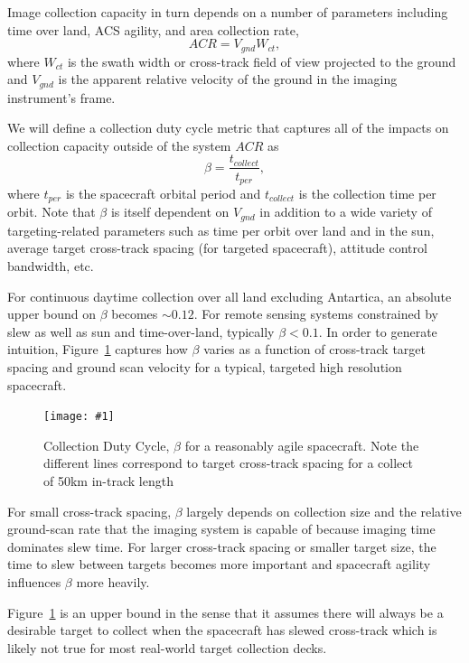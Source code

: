 \documentclass[]{spieman}  %
\newcommand{\includefigure}[3]
{
  \begin{figure}[h!tb]
  \centering
  \texttt{[image: \#1]}
  \caption[]{#3}
  \label{#2}
  \end{figure}
}
\begin{document}
Image collection capacity in turn depends on a number of parameters including time over land, ACS agility, and area collection rate,
\begin{equation}
	\label{eq:acr_def}
    ACR = V_{gnd}W_{ct},
\end{equation}
where $W_{ct}$ is the swath width or cross-track field of view projected to the ground and $V_{gnd}$ is the apparent relative velocity of the ground in the imaging instrument's frame.

We will define a collection duty cycle metric that captures all of the impacts on collection capacity outside of the system $ACR$ as
\begin{equation}
    \beta = \frac{t_{collect}}{t_{per}},
\end{equation} 
where $t_{per}$ is the spacecraft orbital period and $t_{collect}$ is the collection time per orbit.  Note that $\beta$ is itself dependent on $V_{gnd}$ in addition to a wide variety of targeting-related parameters such as time per orbit over land and in the sun, average target cross-track spacing (for targeted spacecraft), attitude control bandwidth, etc.

For continuous daytime collection over all land excluding Antartica, an absolute upper bound on $\beta$ becomes $\sim 0.12$.  For remote sensing systems constrained by slew as well as sun and time-over-land, typically $\beta < 0.1$.  In order to generate intuition, Figure~\ref{fig:beta} captures how $\beta$ varies as a function of cross-track target spacing and ground scan velocity for a typical, targeted high resolution spacecraft.

\includefigure{figures/collection_dc.pgf}{fig:beta}{Collection Duty Cycle, $\beta$ for a reasonably agile spacecraft.  Note the different lines correspond to target cross-track spacing for a collect of 50km in-track length}

For small cross-track spacing, $\beta$ largely depends on collection size and the relative ground-scan rate that the imaging system is capable of because imaging time dominates slew time.  For larger cross-track spacing or smaller target size, the time to slew between targets becomes more important and spacecraft agility influences $\beta$ more heavily.

Figure~\ref{fig:beta} is an upper bound in the sense that it assumes there will always be a desirable target to collect when the spacecraft has slewed cross-track which is likely not true for most real-world target collection decks.  
\end{document}
